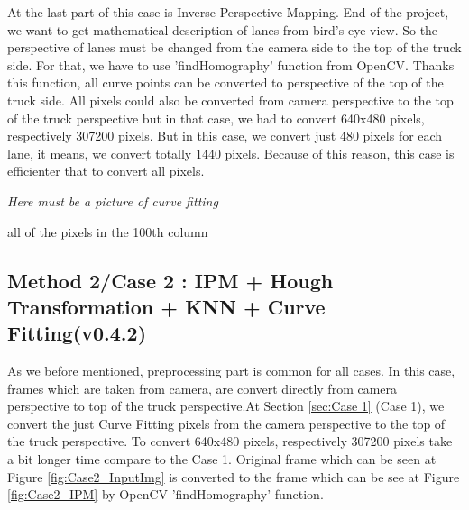At the last part of this case is Inverse Perspective Mapping. End of the project, we want to get mathematical description of lanes from bird's-eye view. So the perspective of lanes must be changed from the camera side to the top of the truck side. For that, we have to use 'findHomography' function from OpenCV. Thanks this function, all curve points can be converted to perspective of the top of the truck side. All pixels could also be converted from camera perspective to the top of the truck perspective but in that case, we had to convert 640x480 pixels, respectively 307200 pixels. But in this case, we convert just 480 pixels for each lane, it means, we convert totally 1440 pixels. Because of this reason, this case is efficienter that to convert all pixels.
 	 		 	


\emph{\color{blue} Here must be a picture of curve fitting}
 
all of the pixels in the 100th column

%

\subsection{Method 2/Case 2 : IPM + Hough Transformation + KNN + Curve Fitting(v0.4.2)}\label{sec:Case 2}

As we before mentioned, preprocessing part is common for all cases. In this case, frames which are taken from camera, are convert directly from camera perspective to top of the truck perspective.At Section \ref{sec:Case 1} (Case 1), we convert the just Curve Fitting pixels from the camera perspective to the top of the truck perspective. To convert 640x480 pixels, respectively 307200 pixels take a bit longer time compare to the Case 1. Original frame which can be seen at Figure \ref{fig:Case2_InputImg} is converted to the frame which can be see at Figure \ref{fig:Case2_IPM} by OpenCV 'findHomography' function.

